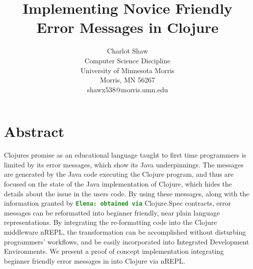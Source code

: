 \documentclass[12pt]{article}
\newcommand{\comment}[1]{{\bf \tt  {#1}}}
\newcommand{\emcomment}[1]{\textcolor{ForestGreen}{\comment{Elena: {#1}}}}
\begin{document}
\pagestyle{plain}
%

\title{Implementing Novice Friendly Error Messages in Clojure}
%
%

\author{
Charlot Shaw \\
Computer Science Discipline \\
University of Minnesota Morris\\
Morris, MN 56267\\
shawx538@morris.umn.edu
}
\maketitle
\thispagestyle{empty}

\section*{\centering Abstract}
Clojures promise as an educational language taught to first time programmers is
limited by its error messages, which show its Java underpinnings. The messages
are generated by the Java code executing the Clojure program, and thus are
focused on the state of the Java implementation of Clojure,
which hides the details about the issue in the users code.
By using these messages, along with the information granted by \emcomment{obtained via} Clojure.Spec contracts,
 error messages can be reformatted into beginner friendly, near plain language representations.
 By integrating the re-formatting code into the Clojure middleware nREPL, the
 transformation can be accomplished without disturbing programmers' workflows, and be easily
 incorporated into Integrated Development Environments.
We present a proof of concept implementation
integrating beginner friendly error messages in into Clojure via nREPL.
\end{document}
